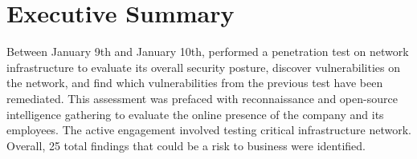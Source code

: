 \section{Executive Summary}

\noindent
\begin{minipage}[t]{0.70\textwidth}
    Between January 9th and January 10th, \team performed a penetration test on \clientP network infrastructure to evaluate its overall security posture, discover vulnerabilities on the network, and find which vulnerabilities from the previous test have been remediated. This assessment was prefaced with reconnaissance and open-source intelligence gathering to evaluate the online presence of the company and its employees. The active engagement involved testing \clientP critical infrastructure network. \\

    Overall, 25 total findings that could be a risk to \clientP business were identified. 
    
\end{minipage}
\hfill %
